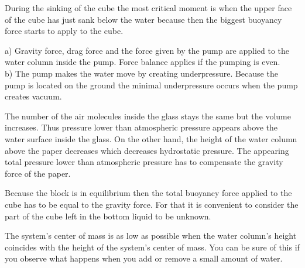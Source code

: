 \documentclass[11pt]{article}
\begin{document}

\hinteng
During the sinking of the cube the most critical moment is when the upper face of the cube has just sank below the water because then the biggest buoyancy force starts to apply to the cube.
\probend
\bigskip


\hinteng
a) Gravity force, drag force and the force given by the pump are applied to the water column inside the pump. Force balance applies if the pumping is even.\\ 
b) The pump makes the water move by creating underpressure. Because the pump is located on the ground the minimal underpressure occurs when the pump creates vacuum.
\probend
\bigskip


\hinteng
The number of the air molecules inside the glass stays the same but the volume increases. Thus pressure lower than atmospheric pressure appears above the water surface inside the glass. On the other hand, the height of the water column above the paper decreases which decreases hydrostatic pressure. The appearing total pressure lower than atmospheric pressure has to compensate the gravity force of the paper.
\probend
\bigskip


\hinteng
Because the block is in equilibrium then the total buoyancy force applied to the cube has to be equal to the gravity force. For that it is convenient to consider the part of the cube left in the bottom liquid to be unknown.
\probend
\bigskip


\hinteng
The system’s center of mass is as low as possible when the water column’s height coincides with the height of the system’s center of mass. You can be sure of this if you observe what happens when you add or remove a small amount of water.
\probend
\bigskip
\end{document}
